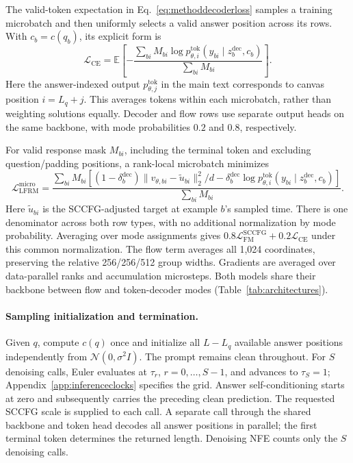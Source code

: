 \documentclass{article}
\newcommand{\E}{\mathbb{E}}
\begin{document}
The valid-token expectation in Eq.~\eqref{eq:methoddecoderloss} samples a training microbatch and then uniformly selects a valid answer position across its rows. With $c_b=c(q_b)$, its explicit form is
\begin{equation}
 \mathcal L_{\mathrm{CE}}=
 \E\!\left[-\frac{\sum_{bi} M_{bi}\log p_{\theta,i}^{\mathrm{tok}}(y_{bi}\mid z_b^{\mathrm{dec}},c_b)}
 {\sum_{bi} M_{bi}}\right].
 \label{eq:methoddecoderlossexpanded}
\end{equation}
Here the answer-indexed output $p_{\theta,j}^{\mathrm{tok}}$ in the main text corresponds to canvas position $i=L_q+j$. This averages tokens within each microbatch, rather than weighting solutions equally. Decoder and flow rows use separate output heads on the same backbone, with mode probabilities $0.2$ and $0.8$, respectively.

For valid response mask $M_{bi}$, including the terminal token and excluding question/padding positions, a rank-local microbatch minimizes
\begin{equation}
 \mathcal L_{\mathrm{LFRM}}^{\mathrm{micro}}=
 \frac{\sum_{bi}M_{bi}\left[
 (1-\delta_b^{\mathrm{dec}})\|v_{\theta,bi}-\widetilde u_{bi}\|_2^2/d
 -\delta_b^{\mathrm{dec}}\log p_{\theta,i}^{\mathrm{tok}}(y_{bi}\mid z_b^{\mathrm{dec}},c_b)\right]}
 {\sum_{bi}M_{bi}}.
 \label{eq:methodmicroobjective}
\end{equation}
Here $\widetilde u_{bi}$ is the SCCFG-adjusted target at example $b$'s sampled time. There is one denominator across both row types, with no additional normalization by mode probability. Averaging over mode assignments gives $0.8\mathcal L_{\mathrm{FM}}^{\mathrm{SCCFG}}+0.2\mathcal L_{\mathrm{CE}}$ under this common normalization. The flow term averages all 1,024 coordinates, preserving the relative 256/256/512 group widths. Gradients are averaged over data-parallel ranks and accumulation microsteps. Both models share their backbone between flow and token-decoder modes (Table~\ref{tab:architectures}).

\paragraph{Sampling initialization and termination.}
Given $q$, compute $c(q)$ once and initialize all $L-L_q$ available answer positions independently from $\mathcal N(0,\sigma^2I)$. The prompt remains clean throughout. For $S$ denoising calls, Euler evaluates at $\tau_r$, $r=0,\ldots,S-1$, and advances to $\tau_S=1$; Appendix~\ref{app:inferenceclocks} specifies the grid. Answer self-conditioning starts at zero and subsequently carries the preceding clean prediction. The requested SCCFG scale is supplied to each call. A separate call through the shared backbone and token head decodes all answer positions in parallel; the first terminal token determines the returned length. Denoising NFE counts only the $S$ denoising calls.
\end{document}
